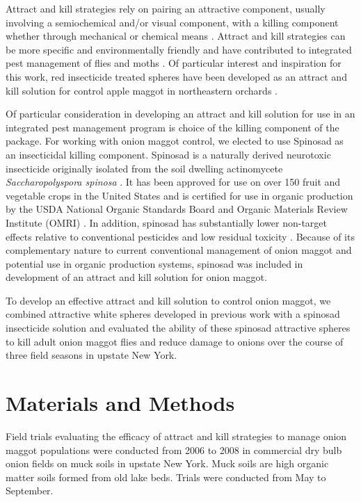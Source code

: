 \documentclass[alpha-refs]{wiley-article}
\begin{document}
Attract and kill strategies rely on pairing an attractive component, usually involving a semiochemical and/or visual component, with a killing component whether through mechanical or chemical means \citep{gregg2018advances}.  Attract and kill strategies can be more specific and environmentally friendly and have contributed to integrated pest management of flies and moths \citep{gregg2018advances}.  Of particular interest and inspiration for this work, red insecticide treated spheres have been developed as an attract and kill solution for control apple maggot in northeastern orchards \citep{bostanian2001attract,duan1995control}.  

Of particular consideration in developing an attract and kill solution for use in an integrated pest management program is choice of the killing component of the package.  For working with onion maggot control, we elected to use Spinosad as an insecticidal killing component.  Spinosad is a naturally derived neurotoxic insecticide originally isolated from the soil dwelling actinomycete \textit{Saccharopolyspora spinosa} \citep{racke2007reduced}.  It has been approved for use on over 150 fruit and vegetable crops in the United States and is certified for use in organic production by the USDA National Organic Standards Board and Organic Materials Review Institute (OMRI) \citep{racke2007reduced,williams2003naturally}.  In addition, spinosad has substantially lower non-target effects relative to conventional pesticides and low residual toxicity \citep{williams2003naturally}.  Because of its complementary nature to current conventional management of onion maggot and potential use in organic production systems, spinosad was included in development of an attract and kill solution for onion maggot.  

To develop an effective attract and kill solution to control onion maggot, we combined attractive white spheres developed in previous work \citep{willett2019} with a spinosad insecticide solution and evaluated the ability of these spinosad attractive spheres to kill adult onion maggot flies and reduce damage to onions over the course of three field seasons in upstate New York.  

\section{Materials and Methods}

Field trials evaluating the efficacy of attract and kill strategies to manage onion maggot populations were conducted from 2006 to 2008 in commercial dry bulb onion fields on muck soils in upstate New York.  Muck soils are high organic matter soils formed from old lake beds.  Trials were conducted from May to September.  
\end{document}

